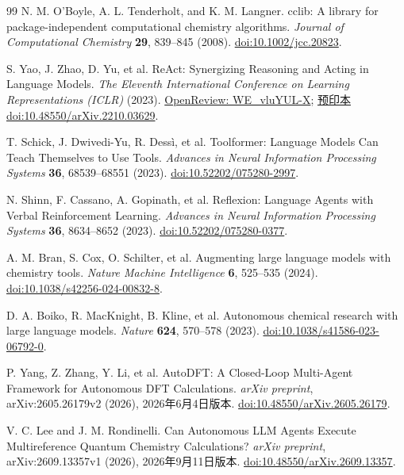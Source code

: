 \begin{thebibliography}{99}
  N. M. O'Boyle, A. L. Tenderholt, and K. M. Langner.
  cclib: A library for package-independent computational chemistry algorithms.
  \emph{Journal of Computational Chemistry} \textbf{29}, 839--845 (2008).
  \href{https://doi.org/10.1002/jcc.20823}{doi:10.1002/jcc.20823}.

  S. Yao, J. Zhao, D. Yu, et al.
  ReAct: Synergizing Reasoning and Acting in Language Models.
  \emph{The Eleventh International Conference on Learning Representations (ICLR)} (2023).
  \href{https://openreview.net/forum?id=WE_vluYUL-X}{OpenReview: WE\_vluYUL-X};
  \href{https://doi.org/10.48550/arXiv.2210.03629}{预印本 doi:10.48550/arXiv.2210.03629}.

  T. Schick, J. Dwivedi-Yu, R. Dessì, et al.
  Toolformer: Language Models Can Teach Themselves to Use Tools.
  \emph{Advances in Neural Information Processing Systems} \textbf{36}, 68539--68551 (2023).
  \href{https://doi.org/10.52202/075280-2997}{doi:10.52202/075280-2997}.

  N. Shinn, F. Cassano, A. Gopinath, et al.
  Reflexion: Language Agents with Verbal Reinforcement Learning.
  \emph{Advances in Neural Information Processing Systems} \textbf{36}, 8634--8652 (2023).
  \href{https://doi.org/10.52202/075280-0377}{doi:10.52202/075280-0377}.

  A. M. Bran, S. Cox, O. Schilter, et al.
  Augmenting large language models with chemistry tools.
  \emph{Nature Machine Intelligence} \textbf{6}, 525--535 (2024).
  \href{https://doi.org/10.1038/s42256-024-00832-8}{doi:10.1038/s42256-024-00832-8}.

  D. A. Boiko, R. MacKnight, B. Kline, et al.
  Autonomous chemical research with large language models.
  \emph{Nature} \textbf{624}, 570--578 (2023).
  \href{https://doi.org/10.1038/s41586-023-06792-0}{doi:10.1038/s41586-023-06792-0}.

  P. Yang, Z. Zhang, Y. Li, et al.
  AutoDFT: A Closed-Loop Multi-Agent Framework for Autonomous DFT Calculations.
  \emph{arXiv preprint}, arXiv:2605.26179v2 (2026), 2026年6月4日版本.
  \href{https://doi.org/10.48550/arXiv.2605.26179}{doi:10.48550/arXiv.2605.26179}.

  V. C. Lee and J. M. Rondinelli.
  Can Autonomous LLM Agents Execute Multireference Quantum Chemistry Calculations?
  \emph{arXiv preprint}, arXiv:2609.13357v1 (2026), 2026年9月11日版本.
  \href{https://doi.org/10.48550/arXiv.2609.13357}{doi:10.48550/arXiv.2609.13357}.


\end{thebibliography}
